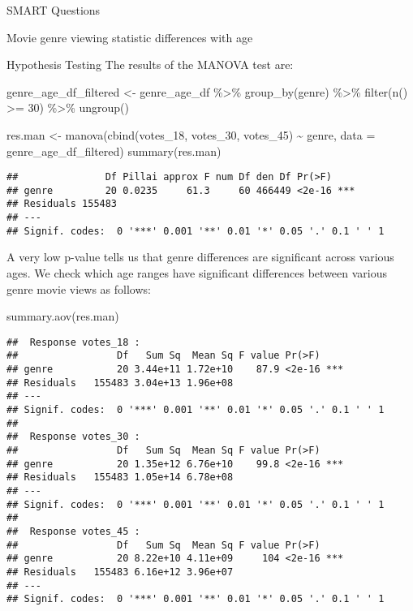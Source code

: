 \documentclass[
  ignorenonframetext,
]{beamer}
\newenvironment{Shaded}{\begin{snugshade}}{\end{snugshade}}
\newcommand{\AttributeTok}[1]{\textcolor[rgb]{0.77,0.63,0.00}{#1}}
\newcommand{\DecValTok}[1]{\textcolor[rgb]{0.00,0.00,0.81}{#1}}
\newcommand{\FunctionTok}[1]{\textcolor[rgb]{0.00,0.00,0.00}{#1}}
\newcommand{\NormalTok}[1]{#1}
\newcommand{\OtherTok}[1]{\textcolor[rgb]{0.56,0.35,0.01}{#1}}
\newcommand{\SpecialCharTok}[1]{\textcolor[rgb]{0.00,0.00,0.00}{#1}}
\begin{document}
\begin{frame}[fragile]{SMART Questions}
\begin{block}{Movie genre viewing statistic differences with age}
\begin{block}{Hypothesis Testing}
The results of the MANOVA test are:

\begin{Shaded}
\begin{Highlighting}[]
\NormalTok{genre\_age\_df\_filtered }\OtherTok{\textless{}{-}}\NormalTok{ genre\_age\_df }\SpecialCharTok{\%\textgreater{}\%}
  \FunctionTok{group\_by}\NormalTok{(genre) }\SpecialCharTok{\%\textgreater{}\%}
    \FunctionTok{filter}\NormalTok{(}\FunctionTok{n}\NormalTok{() }\SpecialCharTok{\textgreater{}=} \DecValTok{30}\NormalTok{) }\SpecialCharTok{\%\textgreater{}\%}
      \FunctionTok{ungroup}\NormalTok{()}

\NormalTok{res.man }\OtherTok{\textless{}{-}} \FunctionTok{manova}\NormalTok{(}\FunctionTok{cbind}\NormalTok{(votes\_18, votes\_30, votes\_45) }\SpecialCharTok{\textasciitilde{}}\NormalTok{ genre, }\AttributeTok{data =}\NormalTok{ genre\_age\_df\_filtered)}
\FunctionTok{summary}\NormalTok{(res.man)}
\end{Highlighting}
\end{Shaded}

\begin{verbatim}
##               Df Pillai approx F num Df den Df Pr(>F)    
## genre         20 0.0235     61.3     60 466449 <2e-16 ***
## Residuals 155483                                         
## ---
## Signif. codes:  0 '***' 0.001 '**' 0.01 '*' 0.05 '.' 0.1 ' ' 1
\end{verbatim}

A very low p-value tells us that genre differences are significant
across various ages. We check which age ranges have significant
differences between various genre movie views as follows:

\begin{Shaded}
\begin{Highlighting}[]
\FunctionTok{summary.aov}\NormalTok{(res.man)}
\end{Highlighting}
\end{Shaded}

\begin{verbatim}
##  Response votes_18 :
##                 Df   Sum Sq  Mean Sq F value Pr(>F)    
## genre           20 3.44e+11 1.72e+10    87.9 <2e-16 ***
## Residuals   155483 3.04e+13 1.96e+08                   
## ---
## Signif. codes:  0 '***' 0.001 '**' 0.01 '*' 0.05 '.' 0.1 ' ' 1
## 
##  Response votes_30 :
##                 Df   Sum Sq  Mean Sq F value Pr(>F)    
## genre           20 1.35e+12 6.76e+10    99.8 <2e-16 ***
## Residuals   155483 1.05e+14 6.78e+08                   
## ---
## Signif. codes:  0 '***' 0.001 '**' 0.01 '*' 0.05 '.' 0.1 ' ' 1
## 
##  Response votes_45 :
##                 Df   Sum Sq  Mean Sq F value Pr(>F)    
## genre           20 8.22e+10 4.11e+09     104 <2e-16 ***
## Residuals   155483 6.16e+12 3.96e+07                   
## ---
## Signif. codes:  0 '***' 0.001 '**' 0.01 '*' 0.05 '.' 0.1 ' ' 1
\end{verbatim}


\end{block}
\end{block}
\end{frame}
\end{document}
